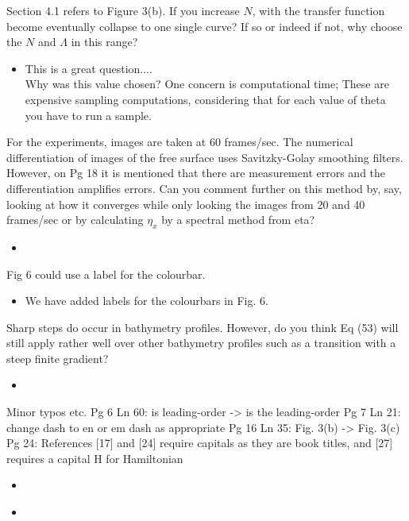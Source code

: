 \documentclass[11pt]{article}
\newcommand{\comment}[1]{{\color{blue} #1}}
\begin{document}
\noindent
\comment{Section 4.1 refers to Figure 3(b). If you increase $N$, with the transfer function become eventually collapse to one single curve? If so or indeed if not, why choose the $N$ and $\Lambda$ in this range?}

\begin{itemize}
\item This is a great question.... \\
Why was this value chosen? One concern is computational time; These are expensive sampling computations, considering that for each value of theta you have to run a sample.
\end{itemize}

\noindent
\comment{For the experiments, images are taken at 60 frames/sec. The numerical differentiation of images of the free surface uses Savitzky-Golay smoothing filters. However, on Pg 18 it is mentioned that there are measurement errors and the differentiation amplifies errors. Can you comment further on this method by, say, looking at how it converges while only looking the images from 20 and 40 frames/sec or by calculating $\eta_x$ by a spectral method from eta? }

\begin{itemize}
\item
\end{itemize}

\noindent
\comment{Fig 6 could use a label for the colourbar.}

\begin{itemize}
\item We have added  labels for the colourbars in Fig. 6.
\end{itemize}

\noindent
\comment{Sharp steps do occur in bathymetry profiles. However, do you think Eq (53) will still apply rather well over other bathymetry profiles such as a transition with a steep finite gradient?}

\begin{itemize}
\item
\end{itemize}

\noindent
\comment{Minor typos etc.
Pg 6 Ln 60: is leading-order -> is the leading-order
Pg 7 Ln 21: change dash to en or em dash as appropriate
Pg 16 Ln 35: Fig. 3(b) -> Fig. 3(c)
Pg 24: References [17] and [24] require capitals as they are book titles, and [27] requires a capital H for Hamiltonian}

\begin{itemize}
\item
\end{itemize}

\noindent
\comment{}

\begin{itemize}
\item
\end{itemize}
\end{document}
